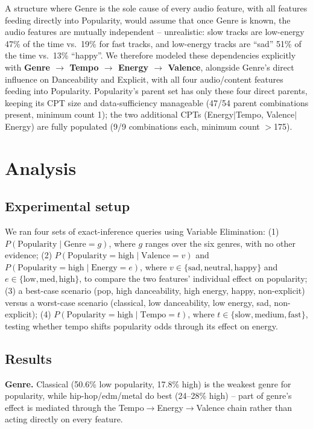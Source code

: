 \documentclass[letterpaper]{article}
\begin{document}
A structure where Genre is the sole cause of every audio feature, with all
features feeding directly into Popularity, would assume that once Genre
is known, the audio features are mutually independent -- unrealistic:
slow tracks are low-energy 47\% of the time vs.\ 19\% for fast tracks, and
low-energy tracks are ``sad'' 51\% of the time vs.\ 13\% ``happy''. We
therefore modeled these dependencies explicitly with \textbf{Genre
$\rightarrow$ Tempo $\rightarrow$ Energy $\rightarrow$ Valence}, alongside
Genre's direct influence on Danceability and Explicit, with all four
audio/content features feeding into Popularity. Popularity's parent set
has only these four direct parents, keeping its CPT size and
data-sufficiency manageable (47/54 parent combinations present, minimum
count 1); the two additional CPTs (Energy$\mid$Tempo, Valence$\mid$Energy)
are fully populated (9/9 combinations each, minimum count $>$175).

\section{Analysis}

\subsection{Experimental setup}
We ran four sets of exact-inference queries using Variable Elimination:
(1) $P(\text{Popularity} \mid \text{Genre} = g)$, where $g$ ranges over
the six genres, with no other evidence; (2) $P(\text{Popularity} =
\text{high} \mid \text{Valence} = v)$ and $P(\text{Popularity} =
\text{high} \mid \text{Energy} = e)$, where $v \in \{\text{sad},
\text{neutral}, \text{happy}\}$ and $e \in \{\text{low}, \text{med},
\text{high}\}$, to compare the two features' individual effect on
popularity; (3) a best-case scenario (pop, high danceability, high energy,
happy, non-explicit) versus a worst-case scenario (classical, low
danceability, low energy, sad, non-explicit); (4) $P(\text{Popularity} =
\text{high} \mid \text{Tempo} = t)$, where $t \in \{\text{slow},
\text{medium}, \text{fast}\}$, testing whether tempo shifts popularity
odds through its effect on energy.

\subsection{Results}
\textbf{Genre.} Classical (50.6\% low popularity, 17.8\% high) is the
weakest genre for popularity, while hip-hop/edm/metal do best (24--28\%
high) -- part of genre's effect is mediated through the
Tempo$\rightarrow$Energy$\rightarrow$Valence chain rather than acting
directly on every feature.
\end{document}
